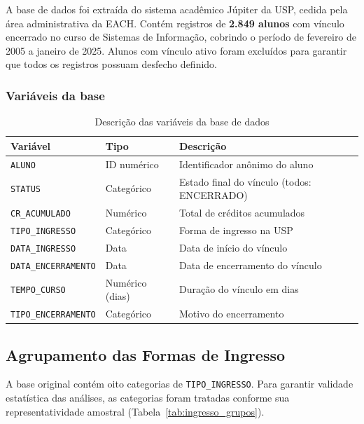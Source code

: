 \documentclass[12pt, a4paper]{article}
\begin{document}
A base de dados foi extraída do sistema acadêmico Júpiter da USP, cedida pela
área administrativa da EACH. Contém registros de \textbf{2.849 alunos} com
vínculo encerrado no curso de Sistemas de Informação, cobrindo o período de
fevereiro de 2005 a janeiro de 2025. Alunos com vínculo ativo foram excluídos
para garantir que todos os registros possuam desfecho definido.

\subsubsection*{Variáveis da base}

\begin{table}[H]
\centering
\caption{Descrição das variáveis da base de dados}
\label{tab:variaveis}
\begin{tabular}{@{}lll@{}}
\toprule
\textbf{Variável} & \textbf{Tipo} & \textbf{Descrição} \\
\midrule
\texttt{ALUNO}              & ID numérico     & Identificador anônimo do aluno \\
\texttt{STATUS}             & Categórico      & Estado final do vínculo (todos: ENCERRADO) \\
\texttt{CR\_ACUMULADO}      & Numérico        & Total de créditos acumulados \\
\texttt{TIPO\_INGRESSO}     & Categórico      & Forma de ingresso na USP \\
\texttt{DATA\_INGRESSO}     & Data            & Data de início do vínculo \\
\texttt{DATA\_ENCERRAMENTO} & Data            & Data de encerramento do vínculo \\
\texttt{TEMPO\_CURSO}       & Numérico (dias) & Duração do vínculo em dias \\
\texttt{TIPO\_ENCERRAMENTO} & Categórico      & Motivo do encerramento \\
\bottomrule
\end{tabular}
\end{table}

\subsection{Agrupamento das Formas de Ingresso}

A base original contém oito categorias de \texttt{TIPO\_INGRESSO}. Para
garantir validade estatística das análises, as categorias foram tratadas
conforme sua representatividade amostral (Tabela~\ref{tab:ingresso_grupos}).
\end{document}
